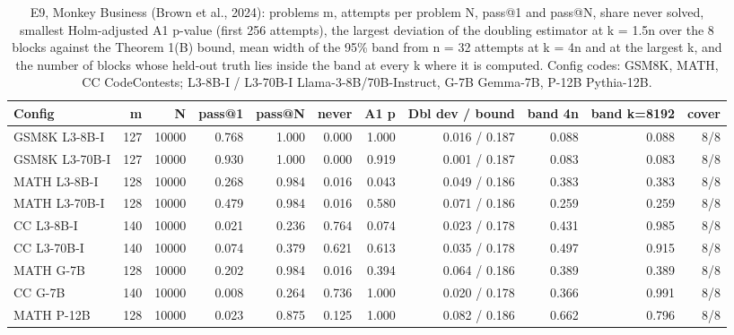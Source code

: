 \begin{table}[t]
\centering
\small
\begin{tabular}{lrrrrrrrrrr}
\toprule
Config & m & N & pass@1 & pass@N & never & A1 p & Dbl dev / bound & band 4n & band k=8192 & cover \\
\midrule
GSM8K L3-8B-I & 127 & 10000 & 0.768 & 1.000 & 0.000 & 1.000 & 0.016 / 0.187 & 0.088 & 0.088 & 8/8 \\
GSM8K L3-70B-I & 127 & 10000 & 0.930 & 1.000 & 0.000 & 0.919 & 0.001 / 0.187 & 0.083 & 0.083 & 8/8 \\
MATH L3-8B-I & 128 & 10000 & 0.268 & 0.984 & 0.016 & 0.043 & 0.049 / 0.186 & 0.383 & 0.383 & 8/8 \\
MATH L3-70B-I & 128 & 10000 & 0.479 & 0.984 & 0.016 & 0.580 & 0.071 / 0.186 & 0.259 & 0.259 & 8/8 \\
CC L3-8B-I & 140 & 10000 & 0.021 & 0.236 & 0.764 & 0.074 & 0.023 / 0.178 & 0.431 & 0.985 & 8/8 \\
CC L3-70B-I & 140 & 10000 & 0.074 & 0.379 & 0.621 & 0.613 & 0.035 / 0.178 & 0.497 & 0.915 & 8/8 \\
MATH G-7B & 128 & 10000 & 0.202 & 0.984 & 0.016 & 0.394 & 0.064 / 0.186 & 0.389 & 0.389 & 8/8 \\
CC G-7B & 140 & 10000 & 0.008 & 0.264 & 0.736 & 1.000 & 0.020 / 0.178 & 0.366 & 0.991 & 8/8 \\
MATH P-12B & 128 & 10000 & 0.023 & 0.875 & 0.125 & 1.000 & 0.082 / 0.186 & 0.662 & 0.796 & 8/8 \\
\bottomrule
\end{tabular}
\caption{E9, Monkey Business (Brown et al., 2024): problems m, attempts per problem N, pass@1 and pass@N, share never solved, smallest Holm-adjusted A1 p-value (first 256 attempts), the largest deviation of the doubling estimator at k = 1.5n over the 8 blocks against the Theorem 1(B) bound, mean width of the 95\% band from n = 32 attempts at k = 4n and at the largest k, and the number of blocks whose held-out truth lies inside the band at every k where it is computed. Config codes: GSM8K, MATH, CC CodeContests; L3-8B-I / L3-70B-I Llama-3-8B/70B-Instruct, G-7B Gemma-7B, P-12B Pythia-12B. }
\label{tab:T14a_monkey_business_data}
\end{table}

